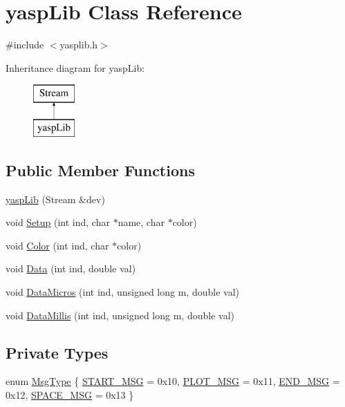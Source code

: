 \hypertarget{classyasp_lib}{}\section{yasp\+Lib Class Reference}
\label{classyasp_lib}


{\ttfamily \#include $<$yasplib.\+h$>$}

Inheritance diagram for yasp\+Lib\+:\begin{figure}[H]
\begin{center}
\leavevmode
\includegraphics[height=2.000000cm]{classyasp_lib}
\end{center}
\end{figure}
\subsection*{Public Member Functions}
\begin{DoxyCompactItemize}
\item 
\mbox{\hyperlink{classyasp_lib_a683109c112526b3eb2cb53c4e1b36a01}{yasp\+Lib}} (Stream \&dev)
\item 
void \mbox{\hyperlink{classyasp_lib_aa1305be6988159432ed5a41e515796aa}{Setup}} (int ind, char $\ast$name, char $\ast$color)
\item 
void \mbox{\hyperlink{classyasp_lib_a49bbfb260ce51983694c3a3d415e7857}{Color}} (int ind, char $\ast$color)
\item 
void \mbox{\hyperlink{classyasp_lib_a5020a42b49db74ebd02fc41e2b9e3b91}{Data}} (int ind, double val)
\item 
void \mbox{\hyperlink{classyasp_lib_a3477505d716271e0ef72f9d645f3ce96}{Data\+Micros}} (int ind, unsigned long m, double val)
\item 
void \mbox{\hyperlink{classyasp_lib_a6b16e66f55632fa5c28dc70a07ff831c}{Data\+Millis}} (int ind, unsigned long m, double val)
\end{DoxyCompactItemize}
\subsection*{Private Types}
\begin{DoxyCompactItemize}
\item 
enum \mbox{\hyperlink{classyasp_lib_ac6d51b8644093b83092ae9041c655cdf}{Msg\+Type}} \{ \mbox{\hyperlink{classyasp_lib_ac6d51b8644093b83092ae9041c655cdfadbb368120a901b8b1cc94cf7f876a022}{S\+T\+A\+R\+T\+\_\+\+M\+SG}} = 0x10, 
\mbox{\hyperlink{classyasp_lib_ac6d51b8644093b83092ae9041c655cdfa30ce626c05e03c2912b32df8f2391564}{P\+L\+O\+T\+\_\+\+M\+SG}} = 0x11, 
\mbox{\hyperlink{classyasp_lib_ac6d51b8644093b83092ae9041c655cdfa7e3ed958b79e2e406b4b50ece022a1b7}{E\+N\+D\+\_\+\+M\+SG}} = 0x12, 
\mbox{\hyperlink{classyasp_lib_ac6d51b8644093b83092ae9041c655cdfa3bbcc479f0d60df39ca424caa73937a0}{S\+P\+A\+C\+E\+\_\+\+M\+SG}} = 0x13
 \}
\end{DoxyCompactItemize}
